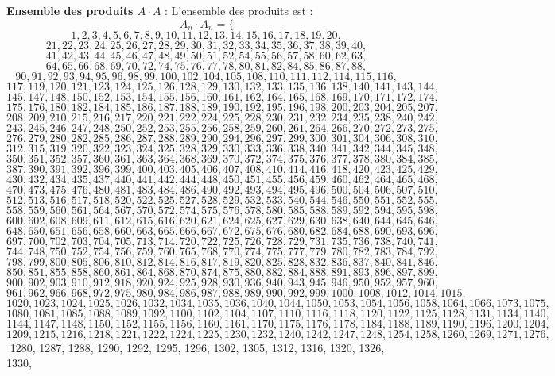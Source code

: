 \documentclass[11pt,a4paper]{article}
\begin{document}
\textbf{Ensemble des produits $A \cdot A$} :
L'ensemble des produits est :
$$ A_{{{n}}} \cdot A_{{{n}}} = \{ $$$$ 1, 2, 3, 4, 5, 6, 7, 8, 9, 10, 11, 12, 13, 14, 15, 16, 17, 18, 19, 20, $$$$ 21, 22, 23, 24, 25, 26, 27, 28, 29, 30, 31, 32, 33, 34, 35, 36, 37, 38, 39, 40, $$$$ 41, 42, 43, 44, 45, 46, 47, 48, 49, 50, 51, 52, 54, 55, 56, 57, 58, 60, 62, 63, $$$$ 64, 65, 66, 68, 69, 70, 72, 74, 75, 76, 77, 78, 80, 81, 82, 84, 85, 86, 87, 88, $$$$ 90, 91, 92, 93, 94, 95, 96, 98, 99, 100, 102, 104, 105, 108, 110, 111, 112, 114, 115, 116, $$$$ 117, 119, 120, 121, 123, 124, 125, 126, 128, 129, 130, 132, 133, 135, 136, 138, 140, 141, 143, 144, $$$$ 145, 147, 148, 150, 152, 153, 154, 155, 156, 160, 161, 162, 164, 165, 168, 169, 170, 171, 172, 174, $$$$ 175, 176, 180, 182, 184, 185, 186, 187, 188, 189, 190, 192, 195, 196, 198, 200, 203, 204, 205, 207, $$$$ 208, 209, 210, 215, 216, 217, 220, 221, 222, 224, 225, 228, 230, 231, 232, 234, 235, 238, 240, 242, $$$$ 243, 245, 246, 247, 248, 250, 252, 253, 255, 256, 258, 259, 260, 261, 264, 266, 270, 272, 273, 275, $$$$ 276, 279, 280, 282, 285, 286, 287, 288, 289, 290, 294, 296, 297, 299, 300, 301, 304, 306, 308, 310, $$$$ 312, 315, 319, 320, 322, 323, 324, 325, 328, 329, 330, 333, 336, 338, 340, 341, 342, 344, 345, 348, $$$$ 350, 351, 352, 357, 360, 361, 363, 364, 368, 369, 370, 372, 374, 375, 376, 377, 378, 380, 384, 385, $$$$ 387, 390, 391, 392, 396, 399, 400, 403, 405, 406, 407, 408, 410, 414, 416, 418, 420, 423, 425, 429, $$$$ 430, 432, 434, 435, 437, 440, 441, 442, 444, 448, 450, 451, 455, 456, 459, 460, 462, 464, 465, 468, $$$$ 470, 473, 475, 476, 480, 481, 483, 484, 486, 490, 492, 493, 494, 495, 496, 500, 504, 506, 507, 510, $$$$ 512, 513, 516, 517, 518, 520, 522, 525, 527, 528, 529, 532, 533, 540, 544, 546, 550, 551, 552, 555, $$$$ 558, 559, 560, 561, 564, 567, 570, 572, 574, 575, 576, 578, 580, 585, 588, 589, 592, 594, 595, 598, $$$$ 600, 602, 608, 609, 611, 612, 615, 616, 620, 621, 624, 625, 627, 629, 630, 638, 640, 644, 645, 646, $$$$ 648, 650, 651, 656, 658, 660, 663, 665, 666, 667, 672, 675, 676, 680, 682, 684, 688, 690, 693, 696, $$$$ 697, 700, 702, 703, 704, 705, 713, 714, 720, 722, 725, 726, 728, 729, 731, 735, 736, 738, 740, 741, $$$$ 744, 748, 750, 752, 754, 756, 759, 760, 765, 768, 770, 774, 775, 777, 779, 780, 782, 783, 784, 792, $$$$ 798, 799, 800, 805, 806, 810, 812, 814, 816, 817, 819, 820, 825, 828, 832, 836, 837, 840, 841, 846, $$$$ 850, 851, 855, 858, 860, 861, 864, 868, 870, 874, 875, 880, 882, 884, 888, 891, 893, 896, 897, 899, $$$$ 900, 902, 903, 910, 912, 918, 920, 924, 925, 928, 930, 936, 940, 943, 945, 946, 950, 952, 957, 960, $$$$ 961, 962, 966, 968, 972, 975, 980, 984, 986, 987, 988, 989, 990, 992, 999, 1000, 1008, 1012, 1014, 1015, $$$$ 1020, 1023, 1024, 1025, 1026, 1032, 1034, 1035, 1036, 1040, 1044, 1050, 1053, 1054, 1056, 1058, 1064, 1066, 1073, 1075, $$$$ 1080, 1081, 1085, 1088, 1089, 1092, 1100, 1102, 1104, 1107, 1110, 1116, 1118, 1120, 1122, 1125, 1128, 1131, 1134, 1140, $$$$ 1144, 1147, 1148, 1150, 1152, 1155, 1156, 1160, 1161, 1170, 1175, 1176, 1178, 1184, 1188, 1189, 1190, 1196, 1200, 1204, $$$$ 1209, 1215, 1216, 1218, 1221, 1222, 1224, 1225, 1230, 1232, 1240, 1242, 1247, 1248, 1254, 1258, 1260, 1269, 1271, 1276, $$$$ 1280, 1287, 1288, 1290, 1292, 1295, 1296, 1302, 1305, 1312, 1316, 1320, 1326, 1330, 
\end{document}
